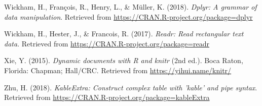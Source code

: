 \documentclass[man]{apa6}
\begin{document}
\hypertarget{ref-R-dplyr}{}
Wickham, H., François, R., Henry, L., \& Müller, K. (2018). \emph{Dplyr:
A grammar of data manipulation}. Retrieved from
\url{https://CRAN.R-project.org/package=dplyr}

\hypertarget{ref-R-readr}{}
Wickham, H., Hester, J., \& Francois, R. (2017). \emph{Readr: Read
rectangular text data}. Retrieved from
\url{https://CRAN.R-project.org/package=readr}

\hypertarget{ref-R-knitr}{}
Xie, Y. (2015). \emph{Dynamic documents with R and knitr} (2nd ed.).
Boca Raton, Florida: Chapman; Hall/CRC. Retrieved from
\url{https://yihui.name/knitr/}

\hypertarget{ref-R-kableExtra}{}
Zhu, H. (2018). \emph{KableExtra: Construct complex table with 'kable'
and pipe syntax}. Retrieved from
\url{https://CRAN.R-project.org/package=kableExtra}

\endgroup
\end{document}
